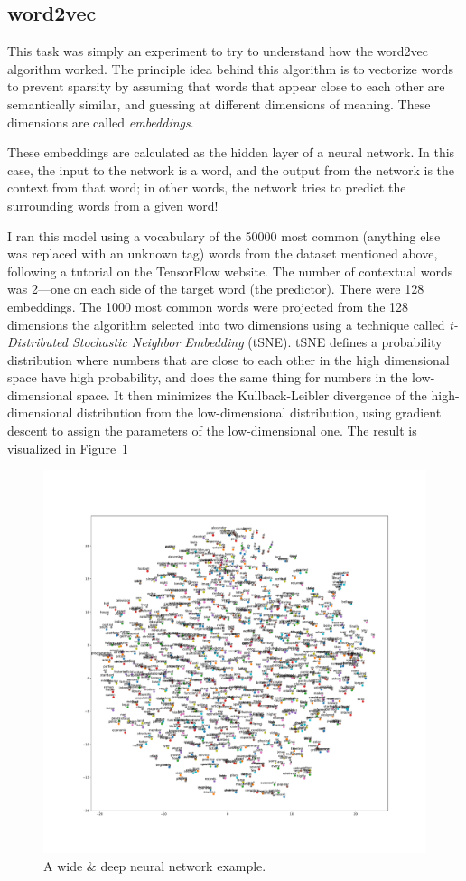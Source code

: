 \documentclass{journal}
\begin{document}
\subsection{word2vec}
This task was simply an experiment to try to understand how the word2vec
algorithm worked. The principle idea behind this algorithm is to vectorize
words to prevent sparsity by assuming that words that appear close to each
other are semantically similar, and guessing at different dimensions of
meaning. These dimensions are called \emph{embeddings}.

These embeddings are calculated as the hidden layer of a neural network. In
this case, the input to the network is a word, and the output from the network
is the context from that word; in other words, the network tries to predict
the surrounding words from a given word!

I ran this model using a vocabulary of the 50000 most common (anything
else was replaced with an unknown tag) words from the
dataset mentioned above, following a tutorial on the
TensorFlow website. The number of contextual words was
2---one on each side of the target word (the predictor). There were
128 embeddings. The 1000 most common words were projected from the 128
dimensions the algorithm selected into two dimensions using a technique
called \emph{t-Distributed Stochastic Neighbor Embedding} (tSNE). tSNE
defines a probability distribution where numbers that are close to each other
in the high dimensional space have high probability, and does the same thing
for numbers in the low-dimensional space. It then minimizes the Kullback-Leibler
divergence of the high-dimensional distribution from the low-dimensional
distribution, using gradient descent to assign the parameters of the
low-dimensional one. The result is visualized in Figure~\ref{fig:tsne}

\begin{figure}[h]
    \includegraphics[width=\textwidth]{tsne}
    \caption{A wide \& deep neural network example.}\label{fig:tsne}
\end{figure}
\end{document}
